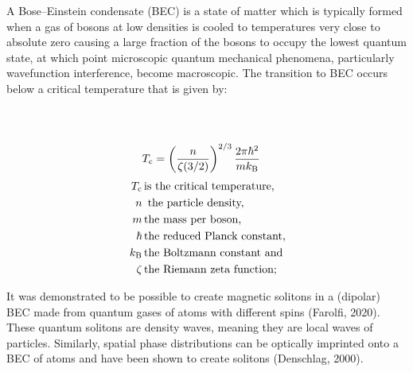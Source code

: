 \documentclass{article}
\begin{document}
    A Bose–Einstein condensate (BEC) is a state of matter which is typically formed when a gas of bosons at low densities is cooled to temperatures very close to absolute zero causing a large fraction of the bosons to occupy the lowest quantum state, at which point microscopic quantum mechanical phenomena, particularly wavefunction interference, become macroscopic. The transition to BEC occurs below a critical temperature that is given by:
    \vspace{-0.5cm}
    \begin{multicols}{2}
    \noindent
    \begin{align*}
        \\
        \\
        \displaystyle T_{\rm {c}} &=\left({\frac {n}{\zeta (3/2)}}\right)^{2/3}{\frac {2\pi \hbar ^{2}}{mk_{\rm {B}}}} 
    \end{align*}
    \begin{align*}
        {\displaystyle \,T_{\rm {c}}} \,  &\text{is the critical temperature,}\\
        \displaystyle \,n \, 	 &\text{ the particle density,}\\
        {\displaystyle \,m}	\, &\text{the mass per boson,}\\
        {\displaystyle \hbar } \, 	&\text{the reduced Planck constant,}\\
        {\displaystyle \,k_{\rm {B}}}\, 	&\text{the Boltzmann constant and}\\
        {\displaystyle \,\zeta }\, 	&\text{the Riemann zeta function;}
    \end{align*}
    \end{multicols}
    It was demonstrated to be possible to create magnetic solitons in a (dipolar) BEC made from quantum gases of atoms with different spins (Farolfi, 2020). These quantum solitons are density waves, meaning they are local waves of particles. Similarly, spatial phase distributions can be optically imprinted onto a BEC of atoms and have been shown to create solitons (Denschlag, 2000). 
    
\end{document}
